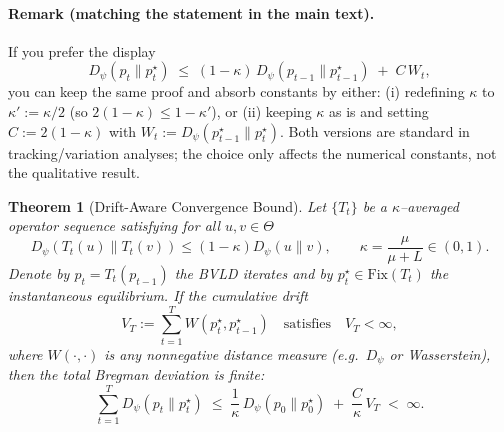 \documentclass[11pt]{article}
\theoremstyle{plain}
\newtheorem{theorem}{Theorem}[section]
\theoremstyle{definition}
\theoremstyle{remark}
\begin{document}
\paragraph{Remark (matching the statement in the main text).}
If you prefer the display
\[
D_\psi(p_t\|p_t^\star)\;\le\;(1-\kappa)\,D_\psi(p_{t-1}\|p_{t-1}^\star)\;+\;C\,W_t,
\]
you can keep the same proof and absorb constants by either:  
(i) redefining $\kappa$ to $\kappa':=\kappa/2$ (so $2(1-\kappa)\le 1-\kappa'$), or  
(ii) keeping $\kappa$ as is and setting $C:=2(1-\kappa)$ with $W_t:=D_\psi(p_{t-1}^\star\|p_t^\star)$.  
Both versions are standard in tracking/variation analyses; the choice only affects the numerical constants, not the qualitative result.

\begin{theorem}[Drift-Aware Convergence Bound]
\label{thm:drift}
Let $\{T_t\}$ be a $\kappa$–averaged operator sequence
satisfying for all $u,v\in\Theta$
\[
D_\psi(T_t(u)\|T_t(v)) \le (1-\kappa) D_\psi(u\|v),
\qquad \kappa=\frac{\mu}{\mu+L}\in(0,1).
\]
Denote by $p_t=T_t(p_{t-1})$ the BVLD iterates and by
$p_t^\star\in\mathrm{Fix}(T_t)$ the instantaneous equilibrium.
If the cumulative drift
\[
V_T:=\sum_{t=1}^T W(p_t^\star,p_{t-1}^\star)
\quad\text{satisfies}\quad V_T<\infty,
\]
where $W(\cdot,\cdot)$ is any nonnegative distance measure
(e.g.\ $D_\psi$ or Wasserstein),
then the total Bregman deviation is finite:
\begin{equation}
\sum_{t=1}^T D_\psi(p_t\|p_t^\star)
\;\le\;
\frac{1}{\kappa}\,D_\psi(p_0\|p_0^\star)
\;+\;
\frac{C}{\kappa}\,V_T
\;<\;\infty.
\label{eq:driftbound}
\end{equation}
\end{theorem}
\end{document}
